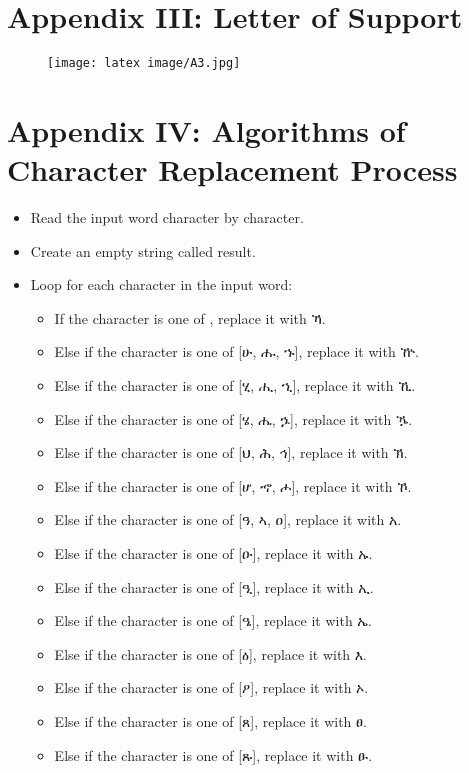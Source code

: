 \section*{Appendix III: Letter of Support}
\begin{figure}[H]
    \centering
    \texttt{[image: latex image/A3.jpg]}
    \label{fig:support_letter}
\end{figure}
\section*{Appendix IV: Algorithms of Character Replacement Process}
\begin{itemize}
    \item Read the input word character by character.
    \item Create an empty string called result.
    \item Loop for each character in the input word:
    \begin{itemize}
        \item If the character is one of \ethiopicfont{[ሀ, ሃ, ሐ, ሓ, ኅ, ኃ]}, replace it with ኻ.
        \item Else if the character is one of [ሁ, ሑ, ኁ], replace it with ዅ.
        \item Else if the character is one of [ሂ, ሒ, ኂ], replace it with ኺ.
        \item Else if the character is one of [ሄ, ሔ, ኌ], replace it with ዄ.
        \item Else if the character is one of [ህ, ሕ, ኅ], replace it with ኽ.
        \item Else if the character is one of [ሆ, ኆ, ሖ], replace it with ኾ.
        \item Else if the character is one of [ዓ, ኣ, ዐ], replace it with አ.
        \item Else if the character is one of [ዑ], replace it with ኡ.
        \item Else if the character is one of [ዒ], replace it with ኢ.
        \item Else if the character is one of [ዔ], replace it with ኤ.
        \item Else if the character is one of [ዕ], replace it with እ.
        \item Else if the character is one of [ዖ], replace it with ኦ.
        \item Else if the character is one of [ጸ], replace it with ፀ.
        \item Else if the character is one of [ጹ], replace it with ፁ.

\end{itemize}
\end{itemize}

